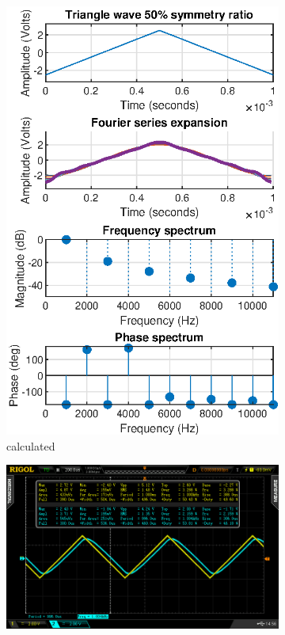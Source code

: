 \documentclass[notitlepage, a4paper, 11pt]{article}
\begin{document}
	\begin{figure}[H]
		\centering
		\begin{subfigure}[][][t]{0.3\textwidth}
			\includegraphics[width=\textwidth]{../Matlab/img/tri50}
			\caption{calculated}
			\label{fig:calc-signals-d}
		\end{subfigure}
		\quad
		\begin{subfigure}[][][t]{0.3\textwidth}
			\includegraphics[width=\textwidth, trim=85 50 112 45, clip]{../img/osc/DS2_QuickPrint2.png}

\end{subfigure}
\end{figure}
\end{document}
